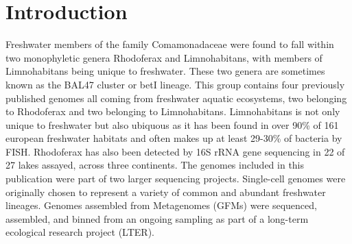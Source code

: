 \documentclass{bmcart}
\begin{document}


\section*{Introduction}
Freshwater members of the family Comamonadaceae were found to fall within two monophyletic genera Rhodoferax and Limnohabitans, with members of Limnohabitans being unique to freshwater.\cite{Newton2011b}  These two genera are sometimes known as the BAL47 cluster or betI lineage.\cite{Newton2011b}  This group contains four previously published genomes all coming from freshwater aquatic ecosystems, two belonging to Rhodoferax and two belonging to Limnohabitans.  Limnohabitans is not only unique to freshwater but also ubiquous as it has been found in over 90\% of 161 european freshwater habitats and often makes up at least 29-30\% of bacteria by FISH.\cite{Jezbera2013,Simek2010a,Kasalicky2013}  Rhodoferax has also been detected by 16S rRNA gene sequencing in 22 of 27 lakes assayed, across three continents.\cite{Zwart2002,Lindstrom2005a}
The genomes included in this publication were part of two larger sequencing projects.  Single-cell genomes were originally chosen to represent a variety of common and abundant freshwater lineages.  Genomes assembled from Metagenomes (GFMs) were sequenced, assembled, and binned from an ongoing sampling as part of a long-term ecological research project (LTER).
\end{document}
